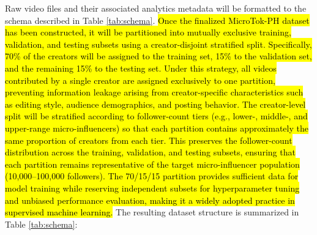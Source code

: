 Raw video files and their associated analytics metadata will be formatted to the schema described in Table \ref{tab:schema}. \hl{Once the finalized MicroTok-PH dataset has been constructed, it will be partitioned into mutually exclusive training, validation, and testing subsets using a creator-disjoint stratified split. Specifically, 70\% of the creators will be assigned to the training set, 15\% to the validation set, and the remaining 15\% to the testing set. Under this strategy, all videos contributed by a single creator are assigned exclusively to one partition, preventing information leakage arising from creator-specific characteristics such as editing style, audience demographics, and posting behavior. The creator-level split will be stratified according to follower-count tiers (e.g., lower-, middle-, and upper-range micro-influencers) so that each partition contains approximately the same proportion of creators from each tier. This preserves the follower-count distribution across the training, validation, and testing subsets, ensuring that each partition remains representative of the target micro-influencer population (10,000--100,000 followers). The 70/15/15 partition provides sufficient data for model training while reserving independent subsets for hyperparameter tuning and unbiased performance evaluation, making it a widely adopted practice in supervised machine learning.} The resulting dataset structure is summarized in Table \ref{tab:schema}:

